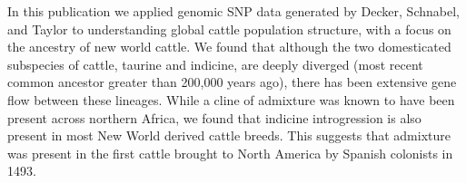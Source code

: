 \documentclass[a4paper,10pt]{article}
\begin{document}
In this publication we applied genomic SNP data generated by Decker, Schnabel, and Taylor to understanding global cattle population structure, with a focus on the ancestry of new world cattle. 
We found that although the two domesticated subspecies of cattle, taurine and indicine, are deeply diverged (most recent common ancestor greater than 200,000 years ago), there has been extensive gene flow between these lineages. 
While a cline of admixture was known to have been present across northern Africa, we found that indicine introgression is also present in most New World derived cattle breeds. This suggests that admixture was present in the first cattle brought to North America by Spanish colonists in 1493.
\end{document}

